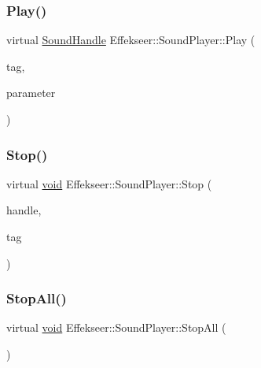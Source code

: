 \subsubsection{\texorpdfstring{Play()}{Play()}}
{\footnotesize\ttfamily virtual \mbox{\hyperlink{namespace_effekseer_a694a300b9b688ca40f6a0d9841d437bf}{Sound\+Handle}} Effekseer\+::\+Sound\+Player\+::\+Play (\begin{DoxyParamCaption}\item[{\mbox{\hyperlink{namespace_effekseer_adb219197297396cf2ab9bee657551a29}{Sound\+Tag}}}]{tag,  }\item[{const \mbox{\hyperlink{struct_effekseer_1_1_sound_player_1_1_instance_parameter}{Instance\+Parameter}} \&}]{parameter }\end{DoxyParamCaption})\hspace{0.3cm}{\ttfamily [pure virtual]}}

\mbox{\label{class_effekseer_1_1_sound_player_af300227673261666ce202159054db9bb}} 
\subsubsection{\texorpdfstring{Stop()}{Stop()}}
{\footnotesize\ttfamily virtual \mbox{\hyperlink{namespace_effekseer_ab34c4088e512200cf4c2716f168deb56}{void}} Effekseer\+::\+Sound\+Player\+::\+Stop (\begin{DoxyParamCaption}\item[{\mbox{\hyperlink{namespace_effekseer_a694a300b9b688ca40f6a0d9841d437bf}{Sound\+Handle}}}]{handle,  }\item[{\mbox{\hyperlink{namespace_effekseer_adb219197297396cf2ab9bee657551a29}{Sound\+Tag}}}]{tag }\end{DoxyParamCaption})\hspace{0.3cm}{\ttfamily [pure virtual]}}

\mbox{\label{class_effekseer_1_1_sound_player_a058465ab0f8c94607651a743767f64d2}} 
\subsubsection{\texorpdfstring{Stop\+All()}{StopAll()}}
{\footnotesize\ttfamily virtual \mbox{\hyperlink{namespace_effekseer_ab34c4088e512200cf4c2716f168deb56}{void}} Effekseer\+::\+Sound\+Player\+::\+Stop\+All (\begin{DoxyParamCaption}{ }\end{DoxyParamCaption})\hspace{0.3cm}{\ttfamily [pure virtual]}}

